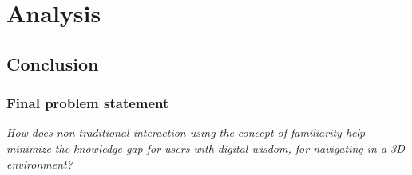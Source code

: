 \chapter{Analysis}








\section{Conclusion}

\subsection{Final problem statement}
\textit{How does non-traditional interaction using the concept of familiarity help minimize the knowledge gap for users with digital wisdom, for navigating in a 3D environment?}